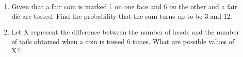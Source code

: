 \begin{enumerate}[label=\thechapter.\arabic*,ref=\thechapter.\theenumi]
	\item Given that a fair coin is marked 1 on one face and 6 on the other and a fair die are tossed. Find the probability that the sum turns up to be 3 and 12. 
		\\
		\solution
		
\item Let X represent the difference between the number of heads and the number of
tails obtained when a coin is tossed 6 times. What are possible values of X?
\end{enumerate}
